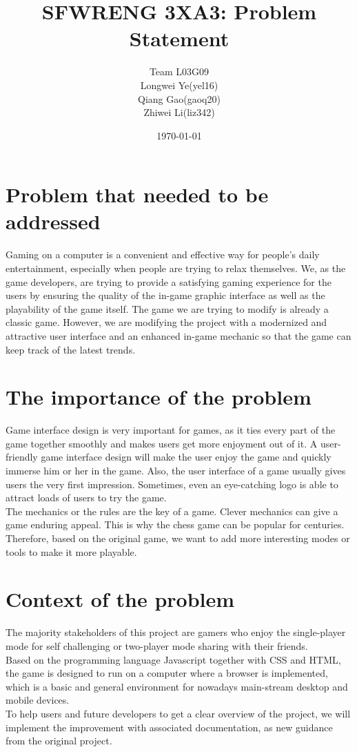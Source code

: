 \documentclass[11pt, letterpaper]{article}
\title{SFWRENG 3XA3: Problem Statement}
\author{Team L03G09 \\
		Longwei Ye(yel16) \\
		Qiang Gao(gaoq20) \\
		Zhiwei Li(liz342) \\}
\date{\today}
\begin{document}
\begin{titlepage}
\maketitle
\end{titlepage}


\section*{Problem that needed to be addressed}
Gaming on a computer is a convenient and effective way for people's daily entertainment, especially 
when people are trying to relax themselves. We, as the game developers, are trying to provide a satisfying 
gaming experience for the users by ensuring the quality of the in-game graphic interface as well as the playability 
of the game itself. The game we are trying to modify is already a classic game. However, we are modifying 
the project with a modernized and attractive user interface and an enhanced in-game mechanic so that the game 
can keep track of the latest trends.

\section*{The importance of the problem}
Game interface design is very important for games, as it ties every part of the game together smoothly and makes users 
get more enjoyment out of it. A user-friendly game interface design will make the user enjoy the game and quickly immerse 
him or her in the game. Also, the user interface of a game usually gives users the very first impression. 
Sometimes, even an eye-catching logo is able to attract loads of users to try the game. \\

\noindent The mechanics or the rules are the key of a game. Clever mechanics can give a game enduring appeal. 
This is why the chess game can be popular for centuries. Therefore, based on the original game, we want to add 
more interesting modes or tools to make it more playable.

\section*{Context of the problem}
The majority stakeholders of this project are gamers who enjoy the single-player mode for self challenging or two-player mode 
sharing with their friends. \\

\noindent Based on the programming language Javascript together with CSS and HTML, the game is designed to run on a computer
where a browser is implemented, which is a basic and general environment for nowadays main-stream desktop and mobile devices. \\

\noindent To help users and future developers to get a clear overview of the project, we will implement the improvement with 
associated documentation, as new guidance from the original project. 
\end{document}
